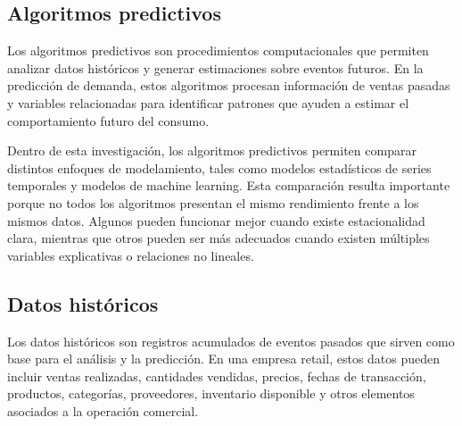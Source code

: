 \subsection{Algoritmos predictivos}

Los algoritmos predictivos son procedimientos computacionales que permiten analizar datos históricos y generar estimaciones sobre eventos futuros. En la predicción de demanda, estos algoritmos procesan información de ventas pasadas y variables relacionadas para identificar patrones que ayuden a estimar el comportamiento futuro del consumo.

Dentro de esta investigación, los algoritmos predictivos permiten comparar distintos enfoques de modelamiento, tales como modelos estadísticos de series temporales y modelos de machine learning. Esta comparación resulta importante porque no todos los algoritmos presentan el mismo rendimiento frente a los mismos datos. Algunos pueden funcionar mejor cuando existe estacionalidad clara, mientras que otros pueden ser más adecuados cuando existen múltiples variables explicativas o relaciones no lineales.




\subsection{Datos históricos}

Los datos históricos son registros acumulados de eventos pasados que sirven como base para el análisis y la predicción. En una empresa retail, estos datos pueden incluir ventas realizadas, cantidades vendidas, precios, fechas de transacción, productos, categorías, proveedores, inventario disponible y otros elementos asociados a la operación comercial.

